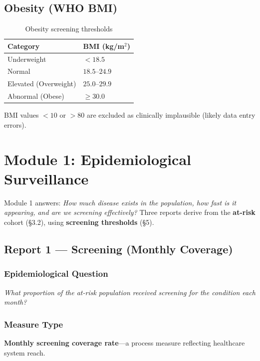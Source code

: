 \documentclass[11pt,a4paper]{article}
\begin{document}
\subsection{Obesity (WHO BMI)}

\begin{table}[ht]
\centering
\caption{Obesity screening thresholds}
\begin{tabular}{@{}ll@{}}
\toprule
\textbf{Category} & \textbf{BMI (kg/m}$^2$\textbf{)} \\
\midrule
Underweight           & $< 18.5$ \\
Normal                & $18.5$--$24.9$ \\
Elevated (Overweight) & $25.0$--$29.9$ \\
Abnormal (Obese)      & $\geq 30.0$ \\
\bottomrule
\end{tabular}
\end{table}

BMI values $< 10$ or $> 80$ are excluded as clinically implausible (likely data entry errors).

\section{Module 1: Epidemiological Surveillance}

Module 1 answers: \textit{How much disease exists in the population, how fast is it appearing, and are we screening effectively?} Three reports derive from the \textbf{at-risk} cohort (§3.2), using \textbf{screening thresholds} (§5).

\subsection{Report 1 --- Screening (Monthly Coverage)}

\subsubsection{Epidemiological Question}
\textit{What proportion of the at-risk population received screening for the condition each month?}

\subsubsection{Measure Type}
\textbf{Monthly screening coverage rate}---a process measure reflecting healthcare system reach.
\end{document}

